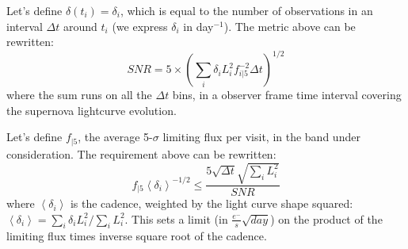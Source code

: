 \documentclass[\docopts]{\docclass}
\begin{document}
Let's define $\delta(t_i) = \delta_i$, which is equal to the number of
observations in an interval $\Delta t$ around $t_i$ (we express
$\delta_i$ in day$^{-1}$). The metric above can be rewritten:
\begin{equation}
  SNR = 5 \times \left(\sum_i \delta_i L^2_i f^{-2}_{i|5} \Delta t\right)^{1/2}
\end{equation}
where the sum runs on all the $\Delta t$ bins, in a observer frame
time interval covering the supernova lightcurve evolution. 

Let's define $f_{|5}$, the average 5-$\sigma$ limiting flux per visit,
in the band under consideration. The requirement above can be
rewritten:
\begin{equation}
  f_{|5} \left<\delta_i\right>^{-1/2} \leq \frac{5 \sqrt{\Delta t} \sqrt{\sum_i L_i^2}}{SNR}
  \label{eqn:global_metric}
\end{equation}
where $\left<\delta_i\right>$ is the cadence, weighted by the light
curve shape squared: $\left<\delta_i\right> = \sum_i \delta_i
L_i^2/\sum_i L_i^2$.  This sets a limit (in $\frac{e^-}{s}
\sqrt{day}$) on the product of the limiting flux times inverse square
root of the cadence.
\end{document}
